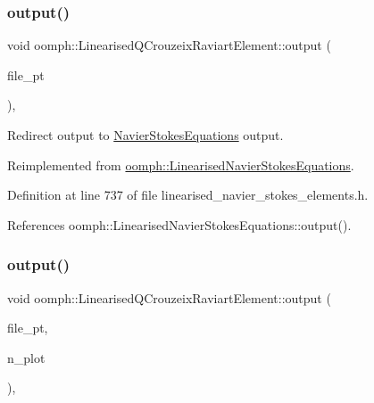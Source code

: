 \subsubsection{\texorpdfstring{output()}{output()}\hspace{0.1cm}{\footnotesize\ttfamily [3/4]}}
{\footnotesize\ttfamily void oomph\+::\+Linearised\+Q\+Crouzeix\+Raviart\+Element\+::output (\begin{DoxyParamCaption}\item[{F\+I\+LE $\ast$}]{file\+\_\+pt }\end{DoxyParamCaption})\hspace{0.3cm}{\ttfamily [inline]}, {\ttfamily [virtual]}}



Redirect output to \hyperlink{classoomph_1_1NavierStokesEquations}{Navier\+Stokes\+Equations} output. 



Reimplemented from \hyperlink{classoomph_1_1LinearisedNavierStokesEquations_a2e1eef71bdd6a06e2b7e8b8488e39437}{oomph\+::\+Linearised\+Navier\+Stokes\+Equations}.



Definition at line 737 of file linearised\+\_\+navier\+\_\+stokes\+\_\+elements.\+h.



References oomph\+::\+Linearised\+Navier\+Stokes\+Equations\+::output().

\mbox{\label{classoomph_1_1LinearisedQCrouzeixRaviartElement_a7418df580bdf0c2fd4dccc263997222e}} 
\subsubsection{\texorpdfstring{output()}{output()}\hspace{0.1cm}{\footnotesize\ttfamily [4/4]}}
{\footnotesize\ttfamily void oomph\+::\+Linearised\+Q\+Crouzeix\+Raviart\+Element\+::output (\begin{DoxyParamCaption}\item[{F\+I\+LE $\ast$}]{file\+\_\+pt,  }\item[{const unsigned \&}]{n\+\_\+plot }\end{DoxyParamCaption})\hspace{0.3cm}{\ttfamily [inline]}, {\ttfamily [virtual]}}



